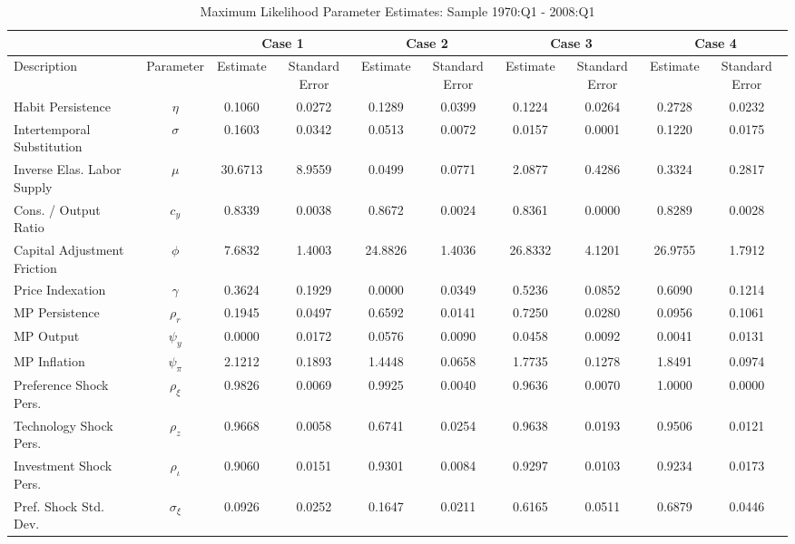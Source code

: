 \begin{sidewaystable}
\begin{scriptsize}
\begin{center}
\caption{Maximum Likelihood Parameter Estimates: Sample 1970:Q1 - 2008:Q1}\label{tb2:parms}
\vspace*{1pc}
\begin{tabular}{|l|c|cc|cc|cc|cc|} \hline
\multicolumn{2}{|c|}{} & \multicolumn{2}{|c|}{Case 1} & \multicolumn{2}{|c|}{Case 2} & \multicolumn{2}{|c|}{Case 3} & \multicolumn{2}{|c|}{Case 4} \\ \hline  
Description & Parameter & Estimate & Standard Error & Estimate & Standard Error & Estimate & Standard Error & Estimate & Standard Error \\ \hline 
Habit Persistence & $\eta$ & 0.1060 & 0.0272 & 0.1289 & 0.0399 & 0.1224 & 0.0264 & 0.2728 & 0.0232 \\  
Intertemporal Substitution & $\sigma$ & 0.1603 & 0.0342 & 0.0513 & 0.0072 & 0.0157 & 0.0001 & 0.1220 & 0.0175\\  
Inverse Elas. Labor Supply & $\mu$ & 30.6713 & 8.9559 & 0.0499 & 0.0771 & 2.0877 & 0.4286 & 0.3324 & 0.2817 \\  
Cons. / Output Ratio & $c_y$ & 0.8339 & 0.0038 & 0.8672 & 0.0024 & 0.8361 & 0.0000 & 0.8289 & 0.0028 \\  
Capital Adjustment Friction & $\phi$ & 7.6832 & 1.4003 & 24.8826 & 1.4036 & 26.8332 & 4.1201 & 26.9755 & 1.7912 \\  
Price Indexation & $\gamma$ & 0.3624 & 0.1929 & 0.0000 & 0.0349 & 0.5236 & 0.0852 & 0.6090 & 0.1214 \\  
MP Persistence & $\rho_r$ & 0.1945 & 0.0497 & 0.6592 & 0.0141 & 0.7250 & 0.0280 & 0.0956 & 0.1061 \\  
MP Output & $\psi_y$ & 0.0000 & 0.0172 & 0.0576 & 0.0090 & 0.0458 & 0.0092 & 0.0041 & 0.0131 \\  
MP Inflation & $\psi_\pi$ & 2.1212 & 0.1893 & 1.4448 & 0.0658 & 1.7735 & 0.1278 & 1.8491 & 0.0974 \\  
Preference Shock Pers. & $\rho_{\xi}$ & 0.9826 & 0.0069 & 0.9925 & 0.0040 & 0.9636 & 0.0070 & 1.0000 & 0.0000 \\  
Technology Shock Pers. & $\rho_{z}$ & 0.9668 & 0.0058 & 0.6741 & 0.0254 & 0.9638 & 0.0193 & 0.9506 & 0.0121 \\  
Investment Shock Pers. & $\rho_{\iota}$ & 0.9060 & 0.0151 & 0.9301 & 0.0084 & 0.9297 & 0.0103 & 0.9234 & 0.0173 \\  
Pref. Shock Std. Dev. & $\sigma_{\xi}$ & 0.0926 & 0.0252 & 0.1647 & 0.0211 & 0.6165 & 0.0511 & 0.6879 & 0.0446 \\  

\end{tabular}
\end{center}
\end{scriptsize}
\end{sidewaystable}
